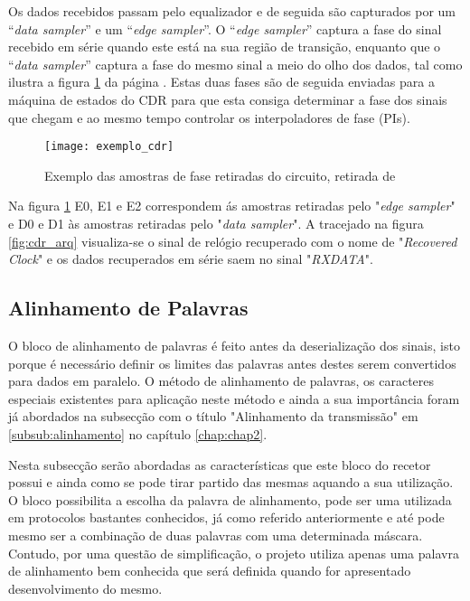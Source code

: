 Os dados recebidos passam pelo equalizador e de seguida são capturados por um “\textit{data sampler}” e um “\textit{edge sampler}”. O “\textit{edge sampler}” captura a fase do sinal recebido em série quando este está na sua região de transição, enquanto que o “\textit{data sampler}” captura a fase do mesmo sinal a meio do olho dos dados, tal como ilustra a figura \ref{fig:exmple_cdr} da página \pageref{fig:exmple_cdr}.  Estas duas fases são de seguida enviadas para a máquina de estados do CDR para que esta consiga determinar a fase dos sinais que chegam e ao mesmo tempo controlar os interpoladores de fase (PIs). 


\begin{figure}[h!]
	\begin{center}
		\leavevmode
		\texttt{[image: exemplo\_cdr]}
		\captionsetup{width=0.5\linewidth}
		\caption{Exemplo das amostras de fase retiradas do circuito, retirada de \cite{R011}}
		\label{fig:exmple_cdr}
	\end{center}
\end{figure}

Na figura \ref{fig:exmple_cdr} E0, E1 e E2 correspondem ás amostras retiradas pelo "\textit{edge sampler}" e D0 e D1 às amostras retiradas pelo "\textit{data sampler}".
A tracejado na figura \ref{fig:cdr_arq} visualiza-se o sinal de relógio recuperado com o nome de "\textit{Recovered Clock}" e os dados recuperados em série saem no sinal "\textit{RXDATA}".


\subsection{Alinhamento de Palavras} \label{subsub:align}

O bloco de alinhamento de palavras é feito antes da deserialização dos sinais, isto porque é necessário definir os limites das palavras antes destes serem convertidos para dados em paralelo. O método de alinhamento de palavras, os caracteres especiais existentes para aplicação neste método e ainda a sua importância foram já abordados na subsecção com o título "Alinhamento da transmissão" em \ref{subsub:alinhamento} no capítulo \ref{chap:chap2}.

Nesta subsecção serão abordadas as características que este bloco do recetor possui e ainda como se pode tirar partido das mesmas aquando a sua utilização. O bloco possibilita a escolha da palavra de alinhamento, pode ser uma utilizada em protocolos bastantes conhecidos, já como referido anteriormente e até pode mesmo ser a combinação de duas palavras com uma determinada máscara. Contudo, por uma questão de simplificação, o projeto utiliza apenas uma palavra de alinhamento bem conhecida que será definida quando for apresentado desenvolvimento do mesmo.

